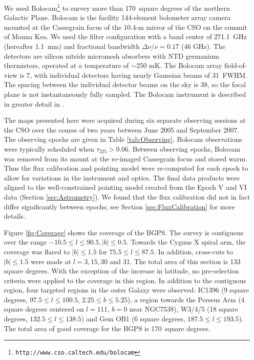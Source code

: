 \documentclass[12pt,preprint]{aastex}
\newcommand{\lon}{\ensuremath{l}}
\def\bgps{BGPS}
\newcommand{\bgpsarea}{170}
\newcommand{\bcamfwhm}{31\arcsec}
\begin{document}
We used Bolocam\footnote{{\tt http://www.cso.caltech.edu/bolocam}} to
survey more than \bgpsarea\ square degrees of the northern Galactic
Plane.  Bolocam is the facility 144-element bolometer array camera
mounted at the Cassegrain focus of the 10.4-m mirror of the CSO on the
summit of Mauna Kea.  We used the filter configuration with a band
center of 271.1~GHz (hereafter 1.1~mm) and fractional bandwidth
$\Delta \nu/\nu = 0.17$ (46 GHz).  The detectors are silicon nitride
micromesh absorbers with NTD germanium thermistors, operated at a
temperature of $\sim$250 mK.  The Bolocam array field-of-view is
7, with individual detectors having nearly Gaussian beams of
\bcamfwhm\ FWHM.  The spacing between the individual detector beams on
the sky is 38\arcsec, so the focal plane is not instantaneously fully
sampled.  The Bolocam instrument is described in greater detail in
\citet{glenn03}.

The maps presented here were acquired during six separate observing
sessions at the CSO over the course of two years between June 2005 and
September 2007. The observing epochs are given in Table
\ref{tab:Observing}.  Bolocam observations were typically scheduled
when $\tau_{225} > 0.06$.  Between observing epochs, Bolocam was
removed from its mount at the re-imaged Cassegrain focus and stored
warm.  Thus the flux calibration and pointing model were re-computed
for each epoch to allow for variations in the instrument and optics.
The final data products were aligned to the well-constrained pointing
model created from the Epoch V and VI data (Section
\ref{sec:Astrometry}).  We found that the flux calibration did not in
fact differ significantly between epochs; see Section
\ref{sec:FluxCalibration} for more details.

Figure \ref{fig:Coverage} shows the coverage of the \bgps.  The survey
is contiguous over the range $-10.5 \le \lon \le 90.5, |b| \le 0.5$.
Towards the Cygnus X spiral arm, the coverage was flared to $|b| \le
1.5$ for $75.5 \le \lon \le 87.5$.  In addition, cross-cuts to $|b|
\le 1.5$ were made at $\lon = 3, 15, 30$ and 31.  The total area of
this section is 133 square degrees.  With the exception of the
increase in latitude, no pre-selection criteria were applied to the
coverage in this region.  In addition to the contiguous region, four
targeted regions in the outer Galaxy were observed: IC1396 (9 square
degrees, $97.5 \le \lon \le 100.5$, $2.25 \le b \le 5.25$), a region
towards the Perseus Arm (4 square degrees centered on $\lon = 111$,
$b=0$ near NGC7538), W3/4/5 (18 square degrees, $132.5 \le l \le
138.5$) and Gem OB1 (6 square degrees, $187.5 \le l \le 193.5$).  The
total area of good coverage for the BGPS is \bgpsarea\ square degrees.
\end{document}
